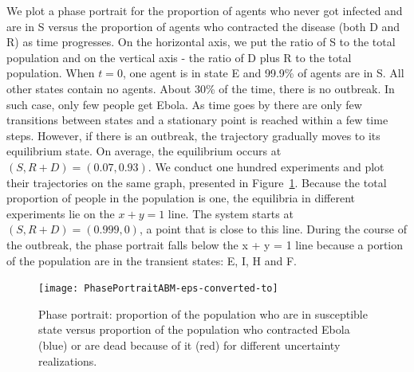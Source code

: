 
We plot a phase portrait for the proportion of agents who never got infected and are in S versus the proportion of agents who contracted the disease (both D and R) as time progresses. On the horizontal axis, we put the ratio of S to the total population and on the vertical axis - the ratio of D plus R to the total population.  When $t = 0$, one agent is in state E and 99.9\% of agents are in S. All other states contain no agents. About 30\% of the time, there is no outbreak. In such case, only few people get Ebola. As time goes by there are only few transitions between states and a stationary point is reached within a few time steps. However, if there is an outbreak, the trajectory gradually moves to its equilibrium state. On average, the equilibrium occurs at $(S, R+ D) = (0.07, 0.93)$. We conduct one hundred experiments and plot their trajectories on the same graph, presented in Figure~\ref{fig:PhasePortraitAbm}. Because the total proportion of people in the population is one, the equilibria in different experiments lie on the $x + y = 1$ line. The system starts at $(S, R+D) = (0.999, 0)$, a point that is close to this line. During the course of the outbreak, the phase portrait falls below the x + y = 1 line because a portion of the population are in the transient states: E, I, H and F. 

%
\begin{figure}[h!]
\begin{center}
\texttt{[image: PhasePortraitABM-eps-converted-to]}
\end{center}
\caption{Phase portrait: proportion of the population who are in susceptible state versus proportion of the population who contracted Ebola (blue) or are dead because of it (red) for different uncertainty realizations.}
\label{fig:PhasePortraitAbm}
\end{figure}


